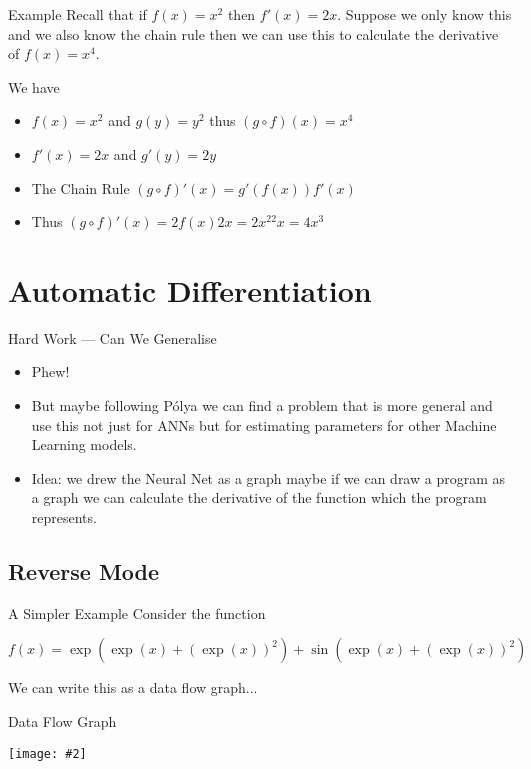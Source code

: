 \documentclass{beamer}
\newcommand {\framedgraphic}[2] {
    \begin{frame}{#1}
        \begin{center}
            \texttt{[image: \#2]}
        \end{center}
    \end{frame}
}
\begin{document}
\begin{frame}[fragile]{Example}
Recall that if $f(x) = x^2$ then $f'(x) = 2x$. Suppose we only know
this and we also know the chain rule then we can use this to calculate
the derivative of $f(x) = x^4$.

We have
\begin{itemize}
\item
$f(x) = x^2$ and $g(y) = y^2$ thus $(g \circ f)(x) = x^4$
\item
$f'(x) = 2x$ and $g'(y) = 2y$
\item
The Chain Rule $(g \circ f)'(x) = g'(f(x))f'(x)$
\item
Thus $(g \circ f)'(x) = 2f(x)2x = 2x^22x = 4x^3$
\end{itemize}
\end{frame}


\section{Automatic Differentiation}

\begin{frame}[fragile]{Hard Work --- Can We Generalise}
\begin{itemize}
\item
Phew!
\item
But maybe following P\'{o}lya we can find a problem that is more
general and use this not just for ANNs but for estimating parameters
for other Machine Learning models.
\item
Idea: we drew the Neural Net as a graph maybe if we can draw a program as a
graph we can calculate the derivative of the function which the
program represents.
\end{itemize}
\end{frame}

\subsection{Reverse Mode}

\begin{frame}[fragile]{A Simpler Example}
Consider the function

$$
f(x) = \exp(\exp(x) + (\exp(x))^2) + \sin(\exp(x) + (\exp(x))^2)
$$

We can write this as a data flow graph...
\end{frame}

\framedgraphic{Data Flow Graph}{diagrams/02c0671aa558b88e5ed6f195b22bbd8a.png}
\end{document}
